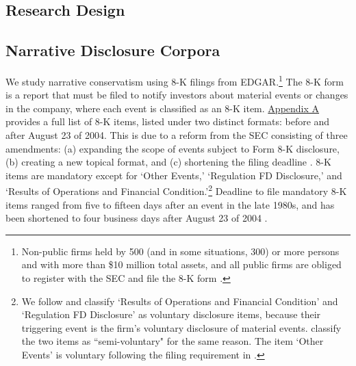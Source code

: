 \documentclass[letterpaper,12pt]{article}
\begin{document}
\begin{spacing}{1.5}
\begin{comment}
Aligned with the prior literature on the usefulness of conservatism, we argue that more complete, news-consistent and timely disclosure of bad news relative to good news enhances contract efficiency [specific hypotheses to be developed]. However, we do not make claims about the valuation role of narrative conservatism.

\end{comment}

\section{Research Design}
\subsection{Narrative Disclosure Corpora} \label{sec3.1}
\noindent We study narrative conservatism using 8-K filings from EDGAR.\footnote{Non-public firms held by 500 (and in some situations, 300) or more persons and with more than \$10 million total assets, and all public firms are obliged to register with the SEC and file the 8-K form \cite{segalAreManagersStrategic2016}.} The 8-K form is a report that must be filed to notify investors about material events or changes in the company, where each event is classified as an 8-K item. \hyperref[appa]{Appendix A} provides a full list of 8-K items, listed under two distinct formats: before and after August 23 of 2004. This is due to a reform from the SEC consisting of three amendments: (a) expanding the scope of events subject to Form 8-K disclosure, (b) creating a new topical format, and (c) shortening the filing deadline \cite{secFinalRuleAdditional2004, lermanNewForm8K2010}. 8-K items are mandatory except for `Other Events,'  `Regulation FD Disclosure,' and `Results of Operations and Financial Condition.'\footnote{We follow  and classify `Results of Operations and Financial Condition' and `Regulation FD Disclosure' as voluntary disclosure items, because their triggering event is the firm's voluntary disclosure of material events.  classify the two items as ``semi-voluntary" for the same reason. The item `Other Events' is voluntary following the filing requirement in . } Deadline to file mandatory 8-K items ranged from five to fifteen days after an event in the late 1980s, and has been shortened to four business days after August 23 of 2004 \cite{lermanNewForm8K2010}.


\end{spacing}
\end{document}
